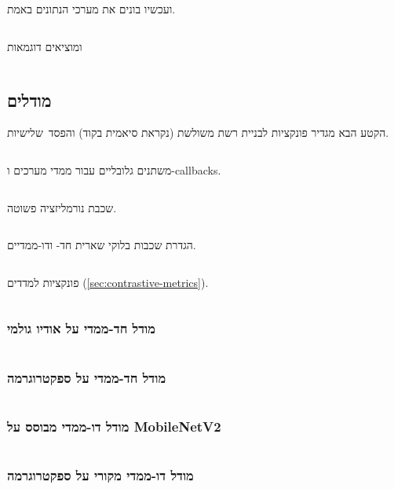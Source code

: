\documentclass[hebrew, a4paper]{article}
\theoremstyle{plain}
\theoremstyle{definition}
\numberwithin{equation}{section}
\begin{document}
ועכשיו בונים את מערכי הנתונים באמת.
\inputminted{python}{snippets/Notebook/06-datasets-def.py}
ומוציאים דוגמאות
\inputminted{python}{snippets/Notebook/07-dataset-examples.py}

\subsection{מודלים}
\label{sec:code-models}

הקטע הבא מגדיר פונקציות לבניית רשת משולשת (נקראת סיאמית בקוד)
והפסד~שלישיות.
\inputminted{python}{snippets/Notebook/08-model-helpers.py}

משתנים גלובליים עבור ממדי מערכים ו-callbacks.
\inputminted{python}{snippets/Notebook/09-model-globals.py}

שכבת נורמליזציה פשוטה.
\inputminted{python}{snippets/Notebook/10-normalization.py}

הגדרת שכבות בלוקי שארית חד- ודו-ממדיים.
\inputminted{python}{snippets/Notebook/11-residual.py}

פונקציות למדדים (\autoref{sec:contrastive-metrics}).
\inputminted{python}{snippets/Notebook/12-metrics.py}

\subsubsection{מודל חד-ממדי על אודיו גולמי}
\label{sec:code-audiocnn}

\inputminted{python}{snippets/Notebook/13-audiocnn.py}

\subsubsection{מודל חד-ממדי על ספקטרוגרמה}
\label{sec:code-spect1d}

\inputminted{python}{snippets/Notebook/14-spect1d.py}

\subsubsection{מודל דו-ממדי מבוסס על MobileNetV2}
\label{sec:code-mobilenet}

\inputminted{python}{snippets/Notebook/15-mobilenet.py}

\subsubsection{מודל דו-ממדי מקורי על ספקטרוגרמה}
\label{sec:code-spect2d}

\inputminted{python}{snippets/Notebook/16-spect2d.py}
\end{document}
